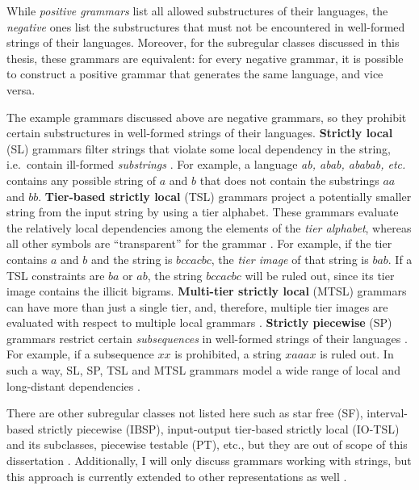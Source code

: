 While \emph{positive grammars} list all allowed substructures of their languages, the \emph{negative} ones list the substructures that must not be encountered in well-formed strings of their languages.
Moreover, for the subregular classes discussed in this thesis, these grammars are equivalent: for every negative grammar, it is possible to construct a positive grammar that generates the same language, and vice versa.

The example grammars discussed above are negative grammars, so they prohibit certain substructures in well-formed strings of their languages.
\textbf{Strictly local} (SL) grammars filter strings that violate some local dependency in the string, i.e.\ contain ill-formed \emph{substrings} \citep{Heinz-2010-SEL}.
For example, a language \emph{ab, abab, ababab, etc.} contains any possible string of $a$ and $b$ that does not contain the substrings $aa$ and $bb$.
\textbf{Tier-based strictly local} (TSL) grammars project a potentially smaller string from the input string by using a tier alphabet.
These grammars evaluate the relatively local dependencies among the elements of the \emph{tier alphabet}, whereas all other symbols are ``transparent'' for the grammar \citep{HeinzRawal11}.
For example, if the tier contains $a$ and $b$ and the string is $bccacbc$, the \emph{tier image} of that string is $bab$.
If a TSL constraints are $ba$ or $ab$, the string $bccacbc$ will be ruled out, since its tier image contains the illicit bigrams.
\textbf{Multi-tier strictly local} (MTSL) grammars can have more than just a single tier, and, therefore, multiple tier images are evaluated with respect to multiple local grammars \citep{DeSantoGraf19FG}.
\textbf{Strictly piecewise} (SP) grammars restrict certain \emph{subsequences} in well-formed strings of their languages \citep{Rogers-HeinzEtAl-2010-LPTSS,Heinz10ldp}.
For example, if a subsequence $xx$ is prohibited, a string $xaaax$ is ruled out.
In such a way, SL, SP, TSL and MTSL grammars model a wide range of local and long-distant dependencies \citep{Heinz11part1,HeinzRawal11,Heinz-Lai-2013-VHS,AksenovaEtAl16,ChandleeHeinz2018}.


There are other subregular classes not listed here such as star free (SF), interval-based strictly piecewise (IBSP), input-output tier-based strictly local (IO-TSL) and its subclasses, piecewise testable (PT), etc., but they are out of scope of this dissertation \citep{Lawson2003,Graf18NELS}.
Additionally, I will only discuss grammars working with strings, but this approach is currently extended to other representations as well \citep{chandlee-etal-2019-learning,chandlee-jardine-2019-autosegmental}.

